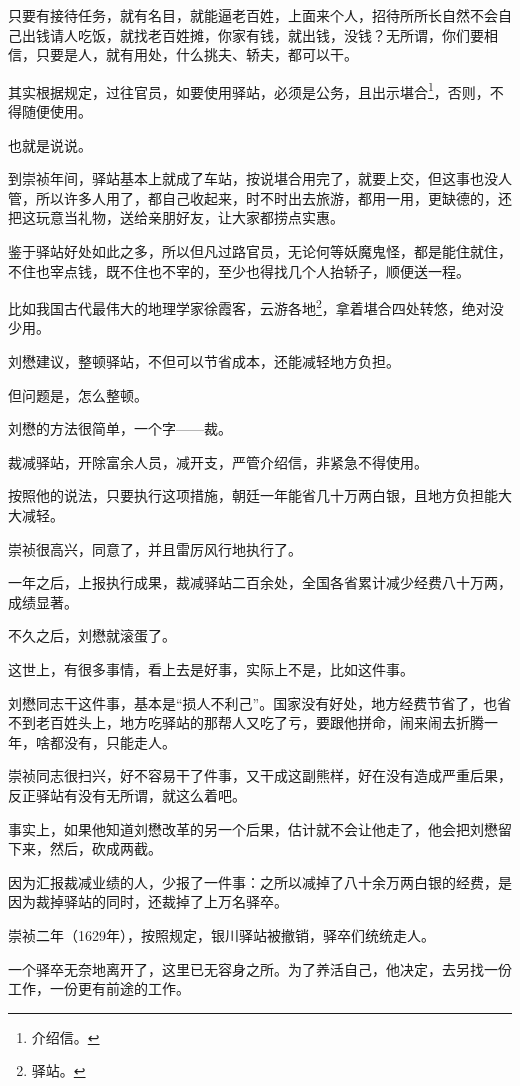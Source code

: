 \begin{multicols}{\theparacolNo}
只要有接待任务，就有名目，就能逼老百姓，上面来个人，招待所所长自然不会自己出钱请人吃饭，就找老百姓摊，你家有钱，就出钱，没钱？无所谓，你们要相信，只要是人，就有用处，什么挑夫、轿夫，都可以干。

其实根据规定，过往官员，如要使用驿站，必须是公务，且出示堪合\footnote{介绍信。}，否则，不得随便使用。

也就是说说。

到崇祯年间，驿站基本上就成了车站，按说堪合用完了，就要上交，但这事也没人管，所以许多人用了，都自己收起来，时不时出去旅游，都用一用，更缺德的，还把这玩意当礼物，送给亲朋好友，让大家都捞点实惠。

鉴于驿站好处如此之多，所以但凡过路官员，无论何等妖魔鬼怪，都是能住就住，不住也宰点钱，既不住也不宰的，至少也得找几个人抬轿子，顺便送一程。

比如我国古代最伟大的地理学家徐霞客，云游各地\footnote{驿站。}，拿着堪合四处转悠，绝对没少用。

刘懋建议，整顿驿站，不但可以节省成本，还能减轻地方负担。

但问题是，怎么整顿。

刘懋的方法很简单，一个字——裁。

裁减驿站，开除富余人员，减开支，严管介绍信，非紧急不得使用。

按照他的说法，只要执行这项措施，朝廷一年能省几十万两白银，且地方负担能大大减轻。

崇祯很高兴，同意了，并且雷厉风行地执行了。

一年之后，上报执行成果，裁减驿站二百余处，全国各省累计减少经费八十万两，成绩显著。

不久之后，刘懋就滚蛋了。

这世上，有很多事情，看上去是好事，实际上不是，比如这件事。

刘懋同志干这件事，基本是“损人不利己”。国家没有好处，地方经费节省了，也省不到老百姓头上，地方吃驿站的那帮人又吃了亏，要跟他拼命，闹来闹去折腾一年，啥都没有，只能走人。

崇祯同志很扫兴，好不容易干了件事，又干成这副熊样，好在没有造成严重后果，反正驿站有没有无所谓，就这么着吧。

事实上，如果他知道刘懋改革的另一个后果，估计就不会让他走了，他会把刘懋留下来，然后，砍成两截。

因为汇报裁减业绩的人，少报了一件事：之所以减掉了八十余万两白银的经费，是因为裁掉驿站的同时，还裁掉了上万名驿卒。

崇祯二年（1629年），按照规定，银川驿站被撤销，驿卒们统统走人。

一个驿卒无奈地离开了，这里已无容身之所。为了养活自己，他决定，去另找一份工作，一份更有前途的工作。


\end{multicols}
